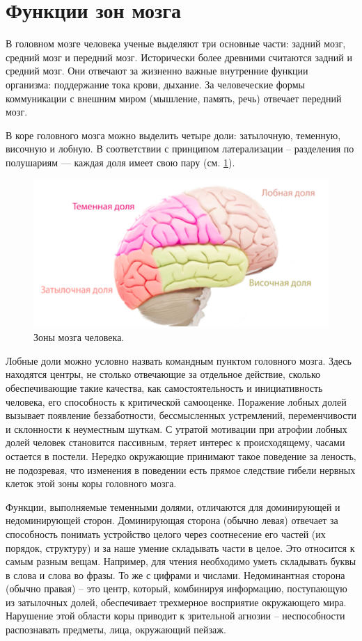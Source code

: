 \documentclass[pdftex,ptm,12pt,a4paper]{report}
\theoremstyle{definition}
\begin{document}
\section{Функции зон мозга}

В головном мозге человека ученые выделяют три основные части: задний мозг, средний мозг и передний мозг. Исторически более древними считаются задний и средний мозг. Они отвечают за жизненно важные внутренние функции организма: поддержание тока крови, дыхание. За человеческие формы коммуникации с внешним миром (мышление, память, речь) отвечает передний мозг.

В коре головного мозга можно выделить четыре доли: затылочную, теменную, височную и лобную. В соответствии с принципом латерализации -- разделения по полушариям — каждая доля имеет свою пару (см. \ref{mozg}).

\begin{figure}[h]
\includegraphics[scale=0.4]{images/mozg.png}
\centering
\caption{Зоны мозга человека.}
\label{mozg}
\end{figure}

Лобные доли можно условно назвать командным пунктом головного мозга. Здесь находятся центры, не столько отвечающие за отдельное действие, сколько обеспечивающие такие качества, как самостоятельность и инициативность человека, его способность к критической самооценке. 
Поражение лобных долей вызывает появление беззаботности, бессмысленных устремлений, переменчивости и склонности к неуместным шуткам. 
С утратой мотивации при атрофии лобных долей человек становится пассивным, теряет интерес к происходящему, часами остается в постели.
Нередко  окружающие принимают такое поведение за леность, 
не подозревая, что изменения в поведении есть прямое следствие гибели 
нервных клеток этой зоны коры головного мозга.

Функции, выполняемые теменными долями, отличаются для доминирующей и недоминирующей сторон. Доминирующая сторона (обычно левая) отвечает за способность понимать устройство целого через соотнесение его частей (их порядок, структуру) и за наше умение складывать части в целое. Это относится к самым разным вещам. Например, для чтения необходимо уметь складывать буквы в слова и слова во фразы. То же с цифрами и числами. Недоминантная сторона (обычно правая) – это центр, который, комбинируя информацию, поступающую из затылочных долей, обеспечивает трехмерное восприятие окружающего мира. Нарушение этой области коры приводит к зрительной агнозии – неспособности распознавать предметы, лица, окружающий пейзаж.
\end{document}
